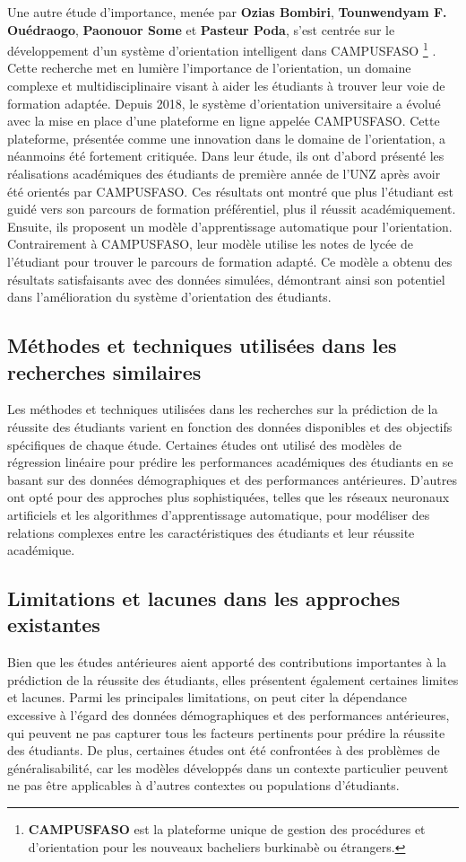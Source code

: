 Une autre étude d'importance, menée par \textbf{Ozias Bombiri}, \textbf{Tounwendyam F. Ouédraogo}, \textbf{Paonouor Some} et \textbf{Pasteur Poda}, s'est centrée sur le développement d'un système d'orientation intelligent dans CAMPUSFASO\textsuperscript{} \footnote{\textbf{CAMPUSFASO} est la plateforme unique de gestion des procédures et d’orientation pour les nouveaux bacheliers burkinabè ou étrangers.} \cite{bombiri2022towards}. Cette recherche met en lumière l'importance de l'orientation, un domaine complexe et multidisciplinaire visant à aider les étudiants à trouver leur voie de formation adaptée. Depuis 2018, le système d'orientation universitaire a évolué avec la mise en place d'une plateforme en ligne appelée CAMPUSFASO. Cette plateforme, présentée comme une innovation dans le domaine de l'orientation, a néanmoins été fortement critiquée.
Dans leur étude, ils ont d'abord présenté les réalisations académiques des étudiants de première année de l'UNZ après avoir été orientés par CAMPUSFASO. Ces résultats ont montré que plus l'étudiant est guidé vers son parcours de formation préférentiel, plus il réussit académiquement.
Ensuite, ils proposent un modèle d'apprentissage automatique pour l'orientation. Contrairement à CAMPUSFASO, leur modèle utilise les notes de lycée de l'étudiant pour trouver le parcours de formation adapté. Ce modèle a obtenu des résultats satisfaisants avec des données simulées, démontrant ainsi son potentiel dans l'amélioration du système d'orientation des étudiants.

\subsection{Méthodes et techniques utilisées dans les recherches similaires}
Les méthodes et techniques utilisées dans les recherches sur la prédiction de la réussite des étudiants varient en fonction des données disponibles et des objectifs spécifiques de chaque étude. Certaines études ont utilisé des modèles de régression linéaire pour prédire les performances académiques des étudiants en se basant sur des données démographiques et des performances antérieures. D'autres ont opté pour des approches plus sophistiquées, telles que les réseaux neuronaux artificiels et les algorithmes d'apprentissage automatique, pour modéliser des relations complexes entre les caractéristiques des étudiants et leur réussite académique.

\subsection{Limitations et lacunes dans les approches existantes}
Bien que les études antérieures aient apporté des contributions importantes à la prédiction de la réussite des étudiants, elles présentent également certaines limites et lacunes. Parmi les principales limitations, on peut citer la dépendance excessive à l'égard des données démographiques et des performances antérieures, qui peuvent ne pas capturer tous les facteurs pertinents pour prédire la réussite des étudiants. De plus, certaines études ont été confrontées à des problèmes de généralisabilité, car les modèles développés dans un contexte particulier peuvent ne pas être applicables à d'autres contextes ou populations d'étudiants.


